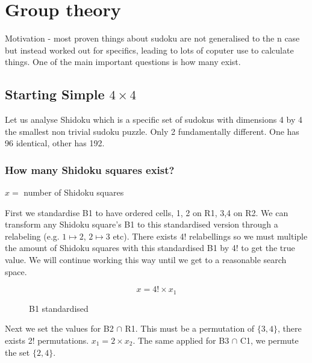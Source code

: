 \documentclass[a4paper,11pt]{report}
\newcounter{row}
\newcounter{col}
\newcounter{rowa}
\newcounter{cola}
\newcommand\setrowa[4]{
  \setcounter{cola}{1}
  \foreach \n in {#1, #2, #3, #4} {
    \edef\x{\value{cola} - 0.5}
    \edef\y{4.5 - \value{rowa}}
    \node[anchor=center] at (\x, \y) {\n};
    \stepcounter{cola}
  }
  \stepcounter{rowa}
}
\begin{document}
\chapter{Group theory}
Motivation - most proven things about sudoku are not generalised to the n case but instead worked out for specifics, leading to lots of coputer use to calculate things.
One of the main important questions is how many exist.

\section{Starting Simple $4 \times 4$}
Let us analyse Shidoku which is a specific set of sudokus with dimensions 4 by 4 the smallest non trivial sudoku puzzle. Only 2 fundamentally different. One has 96 identical, other has 192. 

\subsection{How many Shidoku squares exist?}

$x=$ number of Shidoku squares

First we standardise B1 to have ordered cells, 1, 2 on R1, 3,4 on R2. We can transform any Shidoku square's B1 to this standardised version through a relabeling (e.g. $1 \mapsto 2$, $2\mapsto 3$ etc). There exists 4! relabellings so we must multiple the amount of Shidoku squares with this standardised B1 by 4! to get the true value. We will continue working this way until we get to a reasonable search space.

\begin{equation}
x = 4!\times x_1
\end{equation}

\begin{figure}[h]
\centering
{}
\caption{B1 standardised}
\label{fig:shidokurelabelling}
\end{figure}

Next we set the values for B2 $\cap$ R1. This must be a permutation of $\{3,4\}$, there exists 2! permutations. $x_1 = 2\times x_2$. The same applied for B3 $\cap$ C1, we permute the set $\{2,4\}$. 
\end{document}
